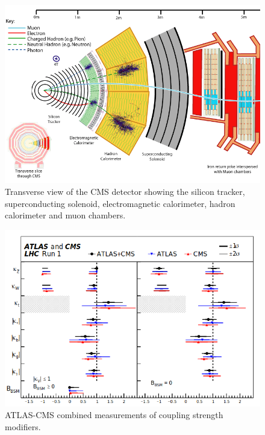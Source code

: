 \documentclass[final,3p]{CSP}
\begin{document}
\begin{figure}[H]
	\centering
	\includegraphics[scale=0.36]{./cms12.png}
	\caption{Transverse view of the CMS detector showing the silicon tracker, superconducting solenoid, electromagnetic calorimeter, hadron calorimeter and muon chambers.}
	\label{figure 5}
\end{figure}

\begin{figure}[H]
	\centering
	\includegraphics[scale=0.4]{./cd7.png}
	\caption{ATLAS-CMS combined measurements of coupling strength modifiers.}
	\label{figure 6}
\end{figure}
\end{document}
